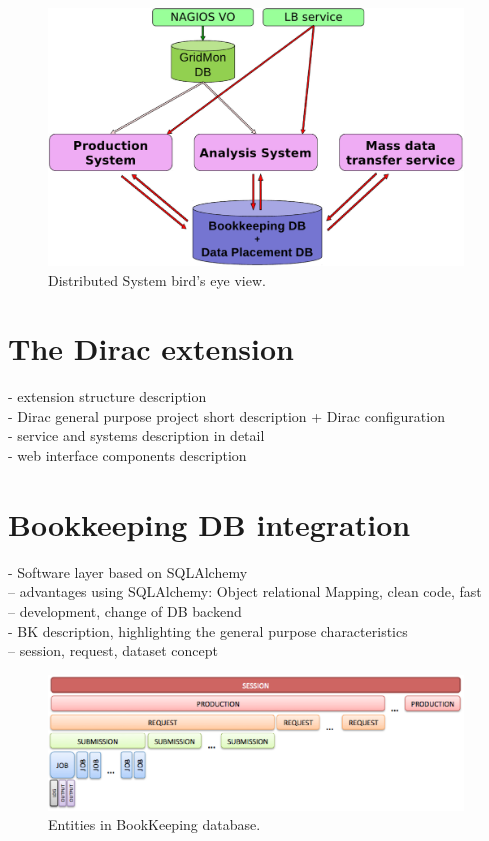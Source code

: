 \documentclass[a4paper]{jpconf}
\begin{document}
\begin{figure}[h]
\includegraphics[width=26pc]{img/distributed_system_bird_eye.eps}\hspace{2pc}%
\caption{\label{fig:distributed_system_bird_eye_view}Distributed System bird's eye view.}
\end{figure}
 
\section{The Dirac extension} 
- extension structure description\\
- Dirac general purpose project short description + Dirac configuration\\
- service and systems description in detail\\
- web interface components description\\


\section{Bookkeeping DB integration}
- Software layer based on SQLAlchemy\\
-- advantages using SQLAlchemy: Object relational Mapping, clean code, fast\\
-- development, change of DB backend\\
- BK description, highlighting the general purpose characteristics\\
-- session, request, dataset concept\\


\begin{figure}[h]
\includegraphics[width=26pc]{img/BK_entities.eps}\hspace{2pc}%
\caption{\label{fig:BK_entities}Entities in BookKeeping database.}
\end{figure}
 
\end{document}
